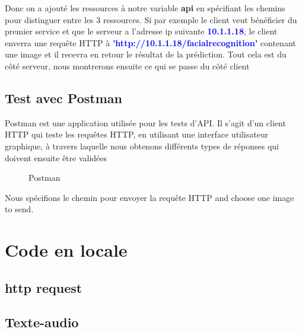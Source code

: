 {Donc on a ajouté les ressources à notre variable \textbf{api} en spécifiant les chemins pour distinguer entre les 3 ressources. Si par exemple le client veut bénéficier du premier service et que le serveur a l'adresse ip suivante \textbf{\textcolor{blue}{10.1.1.18}}, le client enverra une requête HTTP à \textbf{\textcolor{blue}{'http://10.1.1.18/facialrecognition'}} contenant une image et il recevra en retour le résultat de la prédiction. Tout cela est du côté serveur, nous montrerons ensuite ce qui se passe du côté client

    \subsection{Test avec Postman}

Postman est une application utilisée pour les tests d'API. Il s'agit d'un client HTTP qui teste les requêtes HTTP, en utilisant une interface utilisateur graphique, à travers laquelle nous obtenons différents types de réponses qui doivent ensuite être validées
\begin{figure}[h] 
\centering
{}
\caption{Postman}
\label{fig:figure2}
\end{figure}

Nous spécifions le chemin pour envoyer la requête HTTP and choose one image to send.



\section{Code en locale}
\subsection{http request}
\subsection{Texte-audio}



}
